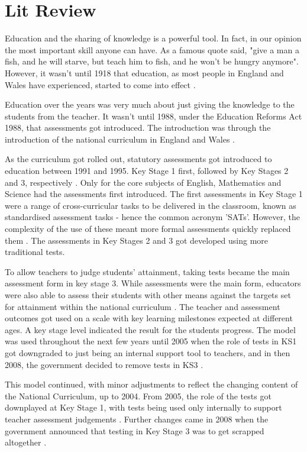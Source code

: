 \chapter{Lit Review}
	\label{chap:lit_review}
	Education and the sharing of knowledge is a powerful tool. In fact, in our opinion the most important skill anyone can have. As a famous quote said, "give a man a fish, and he will starve, but teach him to fish, and he won't be hungry anymore". However, it wasn't until 1918 that education, as most people in England and Wales have experienced, started to come into effect \cite{education1918}.
	
	Education over the years was very much about just giving the knowledge to the students from the teacher. It wasn't until 1988, under the Education Reforms Act 1988, that assessments got introduced. The introduction was through the introduction of the national curriculum in England and Wales \cite{education1988}.
	
	As the curriculum got rolled out, statutory assessments got introduced to education between 1991 and 1995. Key Stage 1 first, followed by Key Stages 2 and 3, respectively \cite{hutchison1994reliable, dillon2011becoming}. Only for the core subjects of English, Mathematics and Science had the assessments first introduced. The first assessments in Key Stage 1 were a range of cross-curricular tasks to be delivered in the classroom, known as standardised assessment tasks - hence the common acronym 'SATs'. However, the complexity of the use of these meant more formal assessments quickly replaced them \cite{hutchison1994reliable, dillon2011becoming}. The assessments in Key Stages 2 and 3 got developed using more traditional tests.
	
	To allow teachers to judge students' attainment, taking tests became the main assessment form in key stage 3. While assessments were the main form, educators were also able to assess their students with other means against the targets set for attainment within the national curriculum \cite{dillon2011becoming}. The teacher and assessment outcomes got used on a scale with key learning milestones expected at different ages. A key stage level indicated the result for the students progress. The model was used throughout the next few years until 2005 when the role of tests in KS1 got downgraded to just being an internal support tool to teachers, and in then 2008, the government decided to remove tests in KS3 \cite{dillon2011becoming}.
	
	This model continued, with minor adjustments to reflect the changing content of the National Curriculum, up to 2004. From 2005, the role of the tests got downplayed at Key Stage 1, with tests being used only internally to support teacher assessment judgements \cite{bbc_no_tests}. Further changes came in 2008 when the government announced that testing in Key Stage 3 was to get scrapped altogether \cite{bbc_tests_scrapped}.
	
